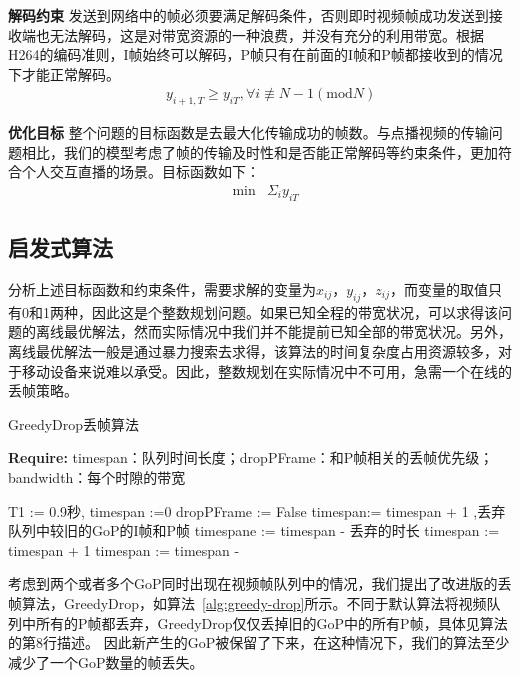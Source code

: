 \textbf{解码约束} 发送到网络中的帧必须要满足解码条件，否则即时视频帧成功发送到接收端也无法解码，这是对带宽资源的一种浪费，并没有充分的利用带宽。根据H264的编码准则，I帧始终可以解码，P帧只有在前面的I帧和P帧都接收到的情况下才能正常解码。
\begin{eqnarray}
  && y_{i+1,T} \geq y_{iT}, \forall i \not\equiv N-1 (\text{mod}N)
\end{eqnarray}

\textbf{优化目标} 整个问题的目标函数是去最大化传输成功的帧数。与点播视频的传输问题相比，我们的模型考虑了帧的传输及时性和是否能正常解码等约束条件，更加符合个人交互直播的场景。目标函数如下：
\begin{eqnarray}
&\min & \Sigma_i {y_{iT}} \nonumber
\label{obj}
\end{eqnarray}

\subsection{启发式算法}
分析上述目标函数和约束条件，需要求解的变量为$x_{ij}$，$y_{ij}$，$z_{ij}$，而变量的取值只有0和1两种，因此这是个整数规划问题。如果已知全程的带宽状况，可以求得该问题的离线最优解法，然而实际情况中我们并不能提前已知全部的带宽状况。另外，离线最优解法一般是通过暴力搜索去求得，该算法的时间复杂度占用资源较多，对于移动设备来说难以承受。因此，整数规划在实际情况中不可用，急需一个在线的丢帧策略。

\begin{algorithm}[htb]
\caption{GreedyDrop丢帧算法}
\label{alg:greedy-drop}
{\bf Require:} timespan：队列时间长度；dropPFrame：和P帧相关的丢帧优先级；bandwidth：每个时隙的带宽
\begin{algorithmic}[1]
\State T1 := 0.9秒, timespan :=0
\State dropPFrame := False
\State {}
\State timespan:= timespan + 1
\EndIf
{}
\State {},丢弃队列中较旧的GoP的I帧和P帧
\State timespane := timespan - 丢弃的时长
\Else
\State {}
\State timespan := timespan + 1
\EndIf
\EndIf
\State timespan := timespan - 
\end{algorithmic}
\end{algorithm}

考虑到两个或者多个GoP同时出现在视频帧队列中的情况，我们提出了改进版的丢帧算法，GreedyDrop，如算法~\ref{alg:greedy-drop}所示。不同于默认算法将视频队列中所有的P帧都丢弃，GreedyDrop仅仅丢掉旧的GoP中的所有P帧，具体见算法的第8行描述。 因此新产生的GoP被保留了下来，在这种情况下，我们的算法至少减少了一个GoP数量的帧丢失。

